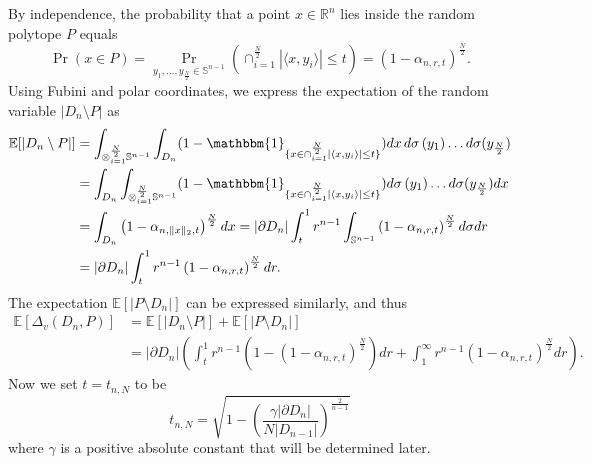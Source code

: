 \documentclass[10pt, twoside, leqno]{article}
\theoremstyle{definition}
\numberwithin{equation}{section}
\newcommand{\E}{{\mathbb{E}}}
\newcommand{\R}{\mathbb{R}}
\newcommand\inner[2]{|\langle #1, #2 \rangle|}
\newcommand\norm[1]{\|#1\|_2}
\begin{document}
By independence, the probability that a point $x\in\R^n$ lies inside the random polytope $P$ equals
\[ 
\Pr\left(x\in P\right) = \Pr_{y_1,\ldots,y_{\frac N2} \in \mathbb{S}^{n-1}}\left(\cap_{i=1}^{\frac N2} \inner{x}{y_i} \leq t\right) =\left(1-\alpha_{n,r,t}\right)^{\frac N2}.
\]
Using Fubini and polar coordinates, we express the expectation of the random variable $ |D_n \setminus P| $ as %
\begin{align*}\E[|D_{n}\setminus P |] & =\int_{\otimes_{i=1}^{\frac{N}{2}}\mathbb{S}^{n-1}}\int_{D_{n}}(1-\mathbbm{1}_{\{x\in\cap_{i=1}^{\frac{N}{2}}\inner{x}{y_{i}}\leq t\}})dx\,d\sigma\left(y_{1}\right)\ldots d\sigma(y_{\frac{N}{2}})\\
& =\int_{D_{n}}\int_{\otimes_{i=1}^{\frac{N}{2}}\mathbb{S}^{n-1}}(1-\mathbbm{1}_{\{x\in\cap_{i=1}^{\frac{N}{2}}\inner{x}{y_{i}}\leq t\}})d\sigma\left(y_{1}\right)\ldots d\sigma(y_{\frac{N}{2}})dx\\
& =\int_{D_{n}}\left(1-\alpha_{n,\norm{x},t}\right)^{\frac{N}{2}}dx=|\partial D_{n}|\int_{t}^{1}r^{n-1}\int_{\mathbb{S}^{n-1}}\left(1-\alpha_{n,r,t}\right)^{\frac{N}{2}}d\sigma dr\\
& =|\partial D_{n}|\int_{t}^{1}r^{n-1}\left(1-\alpha_{n,r,t}\right)^{\frac{N}{2}}dr.
\end{align*}
The expectation $ \E[|P \setminus D_n|] $ can be expressed similarly, and thus
\begin{equation}\label{eq:Main_eq}
\begin{aligned}
\E[\Delta_v(D_n,P)] &= \E[|D_n \setminus P|] + \E[|P \setminus D_n|]  \\& ={|\partial D_n|}\left(\int_{t}^{1}r^{n-1}\left(1 - \left(1-\alpha_{n,r,t}\right)^{\frac N2}\right)dr +
\int_{1}^{\infty}r^{n-1}\left(1-\alpha_{n,r,t}\right)^{\frac N2}dr\right).
\end{aligned}
\end{equation}
Now we set $ t=t_{n,N} $ to be  
\[t_{n,N}=\sqrt{1 - \left(\frac{\gamma|\partial D_n|}{N|D_{n-1}|}\right)^{\frac 2{n-1}}}\] where $ \gamma $ is a positive absolute constant that will be determined later.
\end{document}
